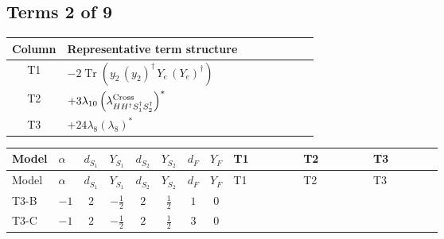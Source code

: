 \documentclass[8pt]{article}
\begin{document}
\begin{landscape}
\subsection*{Terms 2 of 9}
\begin{center}
\begin{tabular}{@{}c >{\raggedright\arraybackslash}p{0.82\linewidth}@{}}
\toprule
Column & Representative term structure \\
\midrule
T1 & \(\displaystyle -2 \operatorname{Tr}\!\left({y_2}\,\left({y_2}\right)^{\dagger}\,{Y_e}\,\left({Y_e}\right)^{\dagger}\right)\) \\
\midrule
T2 & \(\displaystyle +3 {\lambda_{10}} \left({\lambda_{H H^\dagger S_1^\dagger S_2^\dagger}^{\rm Cross}}\right)^{*}\) \\
\midrule
T3 & \(\displaystyle +24 {\lambda_8} \left({\lambda_8}\right)^{*}\) \\
\midrule
\bottomrule
\end{tabular}
\end{center}
\smallskip
\tiny
\begin{longtable}{@{}llcccccc >{\raggedright\arraybackslash}p{0.21\linewidth} >{\raggedright\arraybackslash}p{0.21\linewidth} >{\raggedright\arraybackslash}p{0.21\linewidth}@{}}
\toprule
Model & $\alpha$ & $d_{S_1}$ & $Y_{S_1}$ & $d_{S_2}$ & $Y_{S_2}$ & $d_F$ & $Y_F$ & T1 & T2 & T3 \\
\midrule
\endfirsthead
\toprule
Model & $\alpha$ & $d_{S_1}$ & $Y_{S_1}$ & $d_{S_2}$ & $Y_{S_2}$ & $d_F$ & $Y_F$ & T1 & T2 & T3 \\
\midrule
\endhead
T3-B & $-1$ & $2$ & $-\frac{1}{2}$ & $2$ & $\frac{1}{2}$ & $1$ & $0$ & \scriptsize\adjustbox{max width=\linewidth}{$\begin{gathered} -2 \operatorname{Tr}\!\left({y_2}\,\left({y_2}\right)^{\dagger}\,{Y_e}\,\left({Y_e}\right)^{\dagger}\right)\end{gathered}$} & \scriptsize\adjustbox{max width=\linewidth}{$\begin{gathered} +3 {\lambda_{10}} \left({\lambda_{H H^\dagger S_1^\dagger S_2^\dagger}^{\rm Cross}}\right)^{*}\end{gathered}$} & \scriptsize\adjustbox{max width=\linewidth}{$\begin{gathered} +24 {\lambda_8} \left({\lambda_8}\right)^{*}\end{gathered}$} \\
\midrule
T3-C & $-1$ & $2$ & $-\frac{1}{2}$ & $2$ & $\frac{1}{2}$ & $3$ & $0$ & \scriptsize\adjustbox{max width=\linewidth}{$\begin{gathered} -3 \operatorname{Tr}\!\left({y_2}\,\left({y_2}\right)^{\dagger}\,{Y_e}\,\left({Y_e}\right)^{\dagger}\right)\end{gathered}$} & \scriptsize\adjustbox{max width=\linewidth}{$\begin{gathered} +3 {\lambda_{10}} \left({\lambda_{H H^\dagger S_1^\dagger S_2^\dagger}^{\rm Cross}}\right)^{*}\end{gathered}$} & \scriptsize\adjustbox{max width=\linewidth}{$\begin{gathered} +24 {\lambda_8} \left({\lambda_8}\right)^{*}\end{gathered}$} \\

\end{longtable}
\end{landscape}
\end{document}
